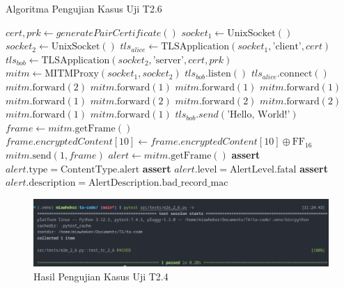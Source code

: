 \begin{algorithm}
  \caption{Algoritma Pengujian Kasus Uji T2.6}
  \label{alg:unit.test.t2.6}
  \begin{algorithmic}
    \State $cert, prk \gets generatePairCertificate()$
    \State $socket_1 \gets \text{UnixSocket}()$
    \State $socket_2 \gets \text{UnixSocket}()$
    \State $tls_{alice} \gets \text{TLSApplication}(socket_1, \text{'client'}, cert)$ 
    \State $tls_{bob} \gets \text{TLSApplication}(socket_2, \text{'server'}, cert, prk)$
    \State $mitm \gets \text{MITMProxy}(socket_1, socket_2)$
    \State
    \State $tls_{bob}.\text{listen}()$  
    \State $tls_{alice}.\text{connect}()$  
    \State
    \State $mitm.\text{forward}(2)$ 
    \State $mitm.\text{forward}(1)$ 
    \State $mitm.\text{forward}(1)$ 
    \State $mitm.\text{forward}(1)$ 
    \State $mitm.\text{forward}(1)$ 
    \State $mitm.\text{forward}(2)$ 
    \State $mitm.\text{forward}(2)$ 
    \State $mitm.\text{forward}(2)$ 
    \State $mitm.\text{forward}(1)$ 
    \State $mitm.\text{forward}(1)$ 
    \State
    \State $tls_{bob}.send(\text{'Hello, World!'})$
    \State $frame \gets mitm.\text{getFrame}()$
    \State $frame.encryptedContent[10] \gets frame.encryptedContent[10] \oplus \text{FF}_{16}$ 
    \State $mitm.\text{send}(1, frame)$
    \State
    \State $alert \gets mitm.\text{getFrame}()$
    \State \textbf{assert} $alert.\text{type} = \text{ContentType.alert}$
    \State \textbf{assert} $alert.\text{level} = \text{AlertLevel.fatal}$
    \State \textbf{assert} $alert.\text{description} = \text{AlertDescription.bad\_record\_mac}$
  \end{algorithmic}
\end{algorithm}

\begin{figure}[ht]
  \centering
  \includegraphics[width=\textwidth]{chapters/res/appendix-4/2.6.png}
  \caption{Hasil Pengujian Kasus Uji T2.4}
  \label{fig:unit.test.t2.6}
\end{figure}

